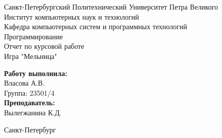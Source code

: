 \documentclass[a4paper]{article}
\begin{document}

\begin{titlepage}	%

	\begin{center}		%

		\large Санкт-Петербургский Политехнический Университет Петра Великого\\
		\large Институт компьютерных наук и технологий \\
		\large Кафедра компьютерных систем и программных технологий\\[6cm]
		
		\huge Программирование\\[0.5cm] %
		\large Отчет по курсовой работе \\[0.1cm]
		\large Игра "Мельница"\\[5cm]

	\end{center}


	\begin{flushright} %
		\begin{minipage}{0.25\textwidth} %
			\begin{flushleft} %

				\large\textbf{Работу выполнила:}\\
				\large Власова А.В.\\
				\large {Группа:} 23501/4\\
				
				\large \textbf{Преподаватель:}\\
				\large Вылегжанина К.Д.

			\end{flushleft}
		\end{minipage}
	\end{flushright}
	
	\vfill %

	\begin{center}
	\large Санкт-Петербург\\
	\large \the\year %
	\end{center} %

\thispagestyle{empty} %
\end{titlepage} %
\end{document}
